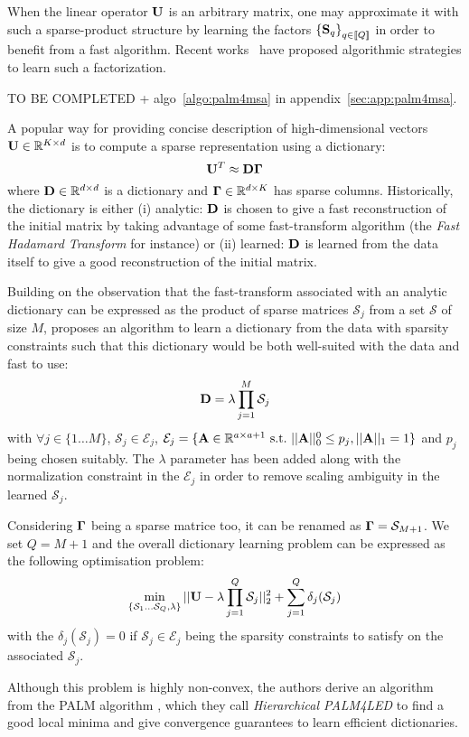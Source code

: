 When the linear operator ${\mathbf{U}}$ is an arbitrary matrix, one may approximate it with such a sparse-product structure by learning the factors $\left \lbrace{\mathbf{S}}_q\right \rbrace_{q\in[\![Q]\!]}$ in order to benefit from a fast algorithm.
Recent works~\cite{LeMagoarou2016Flexible} have proposed algorithmic strategies to learn such a factorization.

TO BE COMPLETED + algo~\ref{algo:palm4msa} in appendix~\ref{sec:app:palm4msa}.

\cite{bolte2014proximal, LeMagoarou2016Flexible}

A popular way for providing concise description of high-dimensional vectors ${\mathbf{U}} \in \mathbb{R}^{K \times d}$ is to compute a sparse representation using a dictionary:
%
\begin{equation}
{\mathbf{U}}^T \approx {\mathbf{D}}{\mathbf{\Gamma}}
\end{equation}
%
where ${\mathbf{D}} \in \mathbb{R}^{d \times d}$ is a dictionary and ${\mathbf{\Gamma}} \in \mathbb{R}^{d \times K}$ has sparse columns. Historically, the dictionary is either (i) analytic: ${\mathbf{D}}$ is chosen to give a fast reconstruction of the initial matrix by taking advantage of some fast-transform algorithm (the \textit{Fast Hadamard Transform} for instance) or (ii) learned: ${\mathbf{D}}$ is learned from the data itself to give a good reconstruction of the initial matrix.

Building on the observation that the fast-transform associated with an analytic dictionary can be expressed as the product of sparse matrices $\mathcal{S}_j$ from a set $\mathcal{S}$ of size $M$, \cite{magoarou2014learning} proposes an algorithm to learn a dictionary from the data with sparsity constraints such that this dictionary would be both well-suited with the data and fast to use:
%
\begin{equation}
{\mathbf{D}} = \lambda \prod_{j=1}^{M}\mathcal{S}_j
\end{equation}
%
with $\forall j \in \{1 \ldots M\}$, $\mathcal{S}_j \in \mathcal{E}_j$, $\mathcal{E}_j = \lbrace {\mathbf{A}} \in \mathbb{R}^{a \times a+1}~\text{s.t.}~||{\mathbf{A}}||_0^0 \leq p_j, ||{\mathbf{A}}||_1 = 1 \rbrace$ and $p_j$ being chosen suitably. The $\lambda$ parameter has been added along with the normalization constraint in the $\mathcal{E}_j$ in order to remove scaling ambiguity in the learned $\mathcal{S}_j$.

Considering ${\mathbf{\Gamma}}$ being a sparse matrice too, it can be renamed as ${\mathbf{\Gamma}} = \mathcal{S}_{M+1}$. We set $Q = M+1$ and the overall dictionary learning problem can be expressed as the following optimisation problem:
%
\begin{equation}
\label{eq:problem_gribon}
\min_{\{\mathcal{S}_1 \dots \mathcal{S}_Q, \lambda\}} ||{\mathbf{U}} - \lambda \prod_{j=1}^{Q}{\mathcal{S}_j}||_2^2 + \sum_{j=1}^{Q} \delta_j(\mathcal{S}_j)
\end{equation}
%
with the $\delta_j(\mathcal{S}_j) = 0$ if $\mathcal{S}_j \in \mathcal{E}_j$ being the sparsity constraints to satisfy on the associated $\mathcal{S}_j$.

Although this problem is highly non-convex, the authors derive an algorithm from the PALM algorithm \cite{bolte2014proximal}, which they call \textit{Hierarchical PALM4LED} to find a good local minima and give convergence guarantees to learn efficient dictionaries.



